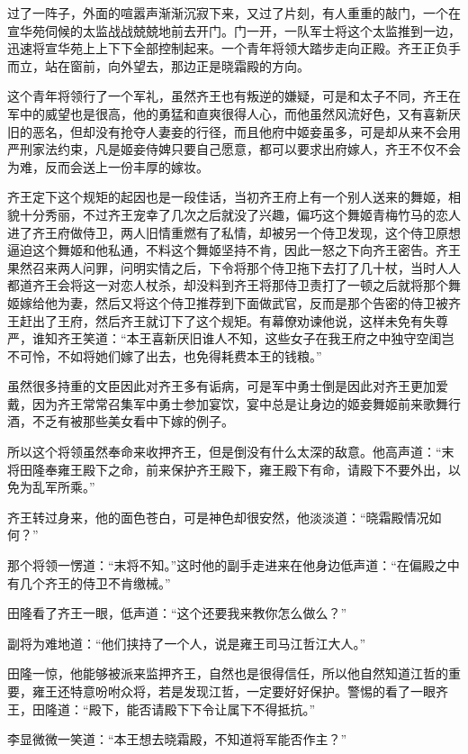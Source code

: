 过了一阵子，外面的喧嚣声渐渐沉寂下来，又过了片刻，有人重重的敲门，一个在宣华苑伺候的太监战战兢兢地前去开门。门一开，一队军士将这个太监推到一边，迅速将宣华苑上上下下全部控制起来。一个青年将领大踏步走向正殿。齐王正负手而立，站在窗前，向外望去，那边正是晓霜殿的方向。

这个青年将领行了一个军礼，虽然齐王也有叛逆的嫌疑，可是和太子不同，齐王在军中的威望也是很高，他的勇猛和直爽很得人心，而他虽然风流好色，又有喜新厌旧的恶名，但却没有抢夺人妻妾的行径，而且他府中姬妾虽多，可是却从来不会用严刑家法约束，凡是姬妾侍婢只要自己愿意，都可以要求出府嫁人，齐王不仅不会为难，反而会送上一份丰厚的嫁妆。

齐王定下这个规矩的起因也是一段佳话，当初齐王府上有一个别人送来的舞姬，相貌十分秀丽，不过齐王宠幸了几次之后就没了兴趣，偏巧这个舞姬青梅竹马的恋人进了齐王府做侍卫，两人旧情重燃有了私情，却被另一个侍卫发现，这个侍卫原想逼迫这个舞姬和他私通，不料这个舞姬坚持不肯，因此一怒之下向齐王密告。齐王果然召来两人问罪，问明实情之后，下令将那个侍卫拖下去打了几十杖，当时人人都道齐王会将这一对恋人杖杀，却没料到齐王将那侍卫责打了一顿之后就将那个舞姬嫁给他为妻，然后又将这个侍卫推荐到下面做武官，反而是那个告密的侍卫被齐王赶出了王府，然后齐王就订下了这个规矩。有幕僚劝谏他说，这样未免有失尊严，谁知齐王笑道：“本王喜新厌旧谁人不知，这些女子在我王府之中独守空闺岂不可怜，不如将她们嫁了出去，也免得耗费本王的钱粮。”

虽然很多持重的文臣因此对齐王多有诟病，可是军中勇士倒是因此对齐王更加爱戴，因为齐王常常召集军中勇士参加宴饮，宴中总是让身边的姬妾舞姬前来歌舞行酒，不乏有被那些美女看中下嫁的例子。

所以这个将领虽然奉命来收押齐王，但是倒没有什么太深的敌意。他高声道：“末将田隆奉雍王殿下之命，前来保护齐王殿下，雍王殿下有命，请殿下不要外出，以免为乱军所乘。”

齐王转过身来，他的面色苍白，可是神色却很安然，他淡淡道：“晓霜殿情况如何？”

那个将领一愣道：“末将不知。”这时他的副手走进来在他身边低声道：“在偏殿之中有几个齐王的侍卫不肯缴械。”

田隆看了齐王一眼，低声道：“这个还要我来教你怎么做么？”

副将为难地道：“他们挟持了一个人，说是雍王司马江哲江大人。”

田隆一惊，他能够被派来监押齐王，自然也是很得信任，所以他自然知道江哲的重要，雍王还特意吩咐众将，若是发现江哲，一定要好好保护。警惕的看了一眼齐王，田隆道：“殿下，能否请殿下下令让属下不得抵抗。”

李显微微一笑道：“本王想去晓霜殿，不知道将军能否作主？”

